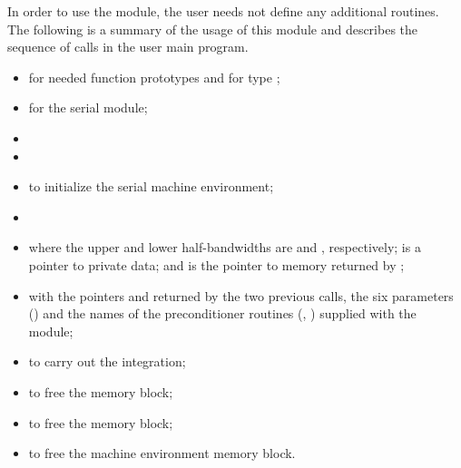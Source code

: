 In order to use the {\cvbandpre} module, the user needs not define any
additional routines. The following is a summary of the usage of this 
module and describes the sequence of calls in the user main program.
\begin{itemize}
  \item {} 
    for needed function prototypes and for type ;

  \item {} 
    for the serial {\nvector} module;

  \item {}

  \item {}

  \item {} 
    to initialize the serial machine environment;

  \item {}

  \item {}

    where the upper and lower half-bandwidths are  and ,
    respectively;  is a pointer to private data; and 
    is the pointer to {\cvodes} memory returned by ;
    
  \item {}
    \newline\hspace*{1in}
    \newline\hspace*{1in}

    with the pointers  and  returned by the two previous calls, 
    the six {\spgmr} parameters () and 
    the names of the preconditioner routines (, ) supplied 
    with the {\cvbandpre} module;

  \item {}
    to carry out the integration;

  \item {}
        to free the {\cvbandpre} memory block;

  \item  {} 
    to free the {\cvodes} memory block;

  \item {}
    to free the machine environment memory block.

\end{itemize}
